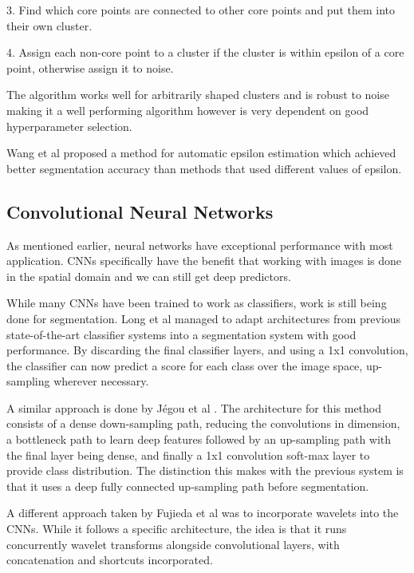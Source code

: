 \documentclass[a4]{article}
\begin{document}
3. Find which core points are connected to other core points and put them into their own cluster. 

4. Assign each non-core point to a cluster if the cluster is within epsilon of a core point, otherwise assign it to noise. 

  

The algorithm works well for arbitrarily shaped clusters and is robust to noise making it a well performing algorithm \cite{kurumalla2016k} however is very dependent on good hyperparameter selection. 

 

Wang et al \cite{wang2019improved} proposed a method for automatic epsilon estimation which achieved better segmentation accuracy than methods that used different values of epsilon. 

 


\subsection*{Convolutional Neural Networks}
As mentioned earlier, neural networks have exceptional performance with most application. CNNs specifically have the benefit that working with images is done in the spatial domain and we can still get deep predictors. 


While many CNNs have been trained to work as classifiers, work is still being done for segmentation. Long et al \cite{long2015fully} managed to adapt architectures from previous state-of-the-art classifier systems into a segmentation system with good performance. By discarding the final classifier layers, and using a 1x1 convolution, the classifier can now predict a score for each class over the image space, up-sampling wherever necessary.   

A similar approach is done by J{\'e}gou et al \cite{jegou2017one}. The architecture for this method consists of a dense down-sampling path, reducing the convolutions in dimension, a bottleneck path to learn deep features followed by an up-sampling path with the final layer being dense, and finally a 1x1 convolution soft-max layer to provide class distribution. The distinction this makes with the previous system is that it uses a deep fully connected up-sampling path before segmentation. 

  

A different approach taken by Fujieda et al \cite{fujieda2018wavelet} was to incorporate wavelets into the CNNs. While it follows a specific architecture, the idea is that it runs concurrently wavelet transforms alongside convolutional layers, with concatenation and shortcuts incorporated. 
\end{document}
